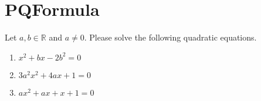 \section{PQFormula}
Let $a,b \in \mathbb{R}$ and $a\neq 0$. Please solve the following quadratic equations.
\begin{enumerate}
	\item $x^2 + bx - 2b^2 = 0$
	\item $3a^2x^2 + 4ax + 1  = 0$
	\item $ax^2 + ax + x + 1 = 0$
\end{enumerate}